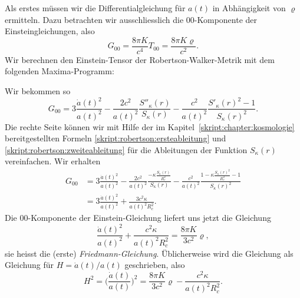 Als erstes müssen wir die Differentialgleichung für $a(t)$
in Abhängigkeit von $\varrho$ ermitteln.
Dazu betrachten wir ausschliesslich die $00$-Komponente der
Einsteingleichungen, also
\begin{equation}
G_{00} = \frac{8\pi K}{c^4} T_{00}=\frac{8\pi K\varrho}{c^2}.
\label{skript:friedmann:einstein}
\end{equation}
Wir berechnen den Einstein-Tensor der Robertson-Walker-Metrik
mit dem folgenden Maxima-Pro\-gramm:

Wir bekommen so
\begin{equation}
G_{00}
=
3\frac{\dot a(t)^2}{a(t)^2}
-\frac{2c^2}{a(t)^2}\frac{S''_\kappa(r)}{S_\kappa(r)}
-\frac{c^2}{a(t)^2}
\frac{S'_\kappa(r)^2-1}{S_\kappa(r)^2}.
\end{equation}
Die rechte Seite können wir mit Hilfe der im
Kapitel~\ref{skript:chapter:kosmologie} bereitgestellten Formeln
\eqref{skript:robertson:ersteableitung} und
\eqref{skript:robertson:zweiteableitung} für die Ableitungen der Funktion
$S_\kappa(r)$ vereinfachen.
Wir erhalten 
\begin{align*}
G_{00}
&=
3\frac{\dot a(t)^2}{a(t)^2}
-\frac{2c^2}{a(t)^2}\frac{-\kappa\displaystyle \frac{S_\kappa(r)}{R_c^2}}{S_\kappa(r)}
-\frac{c^2}{a(t)^2}
\frac{1-\kappa \frac{\displaystyle S_\kappa(r)^2}{R_c^2}-1}{S_\kappa(r)^2}
\\
&=
3\frac{\dot a(t)^2}{a(t)^2}
+\frac{3c^2\kappa}{a(t)^2R_c^2}.
\end{align*}
Die $00$-Komponente der Einstein-Gleichung liefert uns jetzt die Gleichung
\begin{equation}
\frac{\dot a(t)^2}{a(t)^2}
+
\frac{c^2\kappa}{a(t)^2R_c^2}
=
\frac{8\pi K}{3c^2}\varrho,
\end{equation}
sie heisst die (erste) {\em Friedmann-Gleichung}.
%
Üblicherweise wird die Gleichung als Gleichung für $H=\dot a(t)/a(t)$
geschrieben, also
\begin{equation}
H^2
=
\biggl(
\frac{\dot a(t)}{a(t)}
\biggr)^2
=
\frac{8\pi K}{3c^2}\varrho
-
\frac{c^2\kappa }{a(t)^2R_c^2}.
\label{skript:friedmann:friedmann}
\end{equation}

